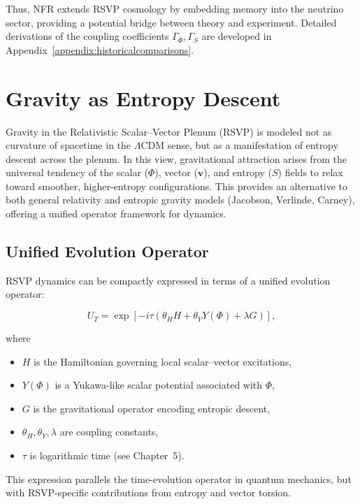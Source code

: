 \documentclass[12pt]{report}
\begin{document}
Thus, NFR extends RSVP cosmology by embedding memory into the neutrino sector, providing a potential bridge between theory and experiment. Detailed derivations of the coupling coefficients $\Gamma_\Phi,\Gamma_S$ are developed in Appendix~\ref{appendix:historicalcomparisons}.


\chapter{Gravity as Entropy Descent}

Gravity in the Relativistic Scalar--Vector Plenum (RSVP) is modeled not as curvature of spacetime in the $\Lambda$CDM sense, but as a manifestation of entropy descent across the plenum. In this view, gravitational attraction arises from the universal tendency of the scalar ($\Phi$), vector ($\mathbf{v}$), and entropy ($S$) fields to relax toward smoother, higher-entropy configurations. This provides an alternative to both general relativity and entropic gravity models (Jacobson, Verlinde, Carney), offering a unified operator framework for dynamics.

\section{Unified Evolution Operator}

RSVP dynamics can be compactly expressed in terms of a unified evolution operator:

\begin{equation}
U_T = \exp\!\left[-i \tau \left(\theta_H H + \theta_Y Y(\Phi) + \lambda G\right)\right],
\label{eq:unified}
\end{equation}

where
\begin{itemize}
    \item $H$ is the Hamiltonian governing local scalar--vector excitations,
    \item $Y(\Phi)$ is a Yukawa-like scalar potential associated with $\Phi$,
    \item $G$ is the gravitational operator encoding entropic descent,
    \item $\theta_H, \theta_Y, \lambda$ are coupling constants,
    \item $\tau$ is logarithmic time (see Chapter~5).
\end{itemize}

This expression parallels the time-evolution operator in quantum mechanics, but with RSVP-specific contributions from entropy and vector torsion.
\end{document}

